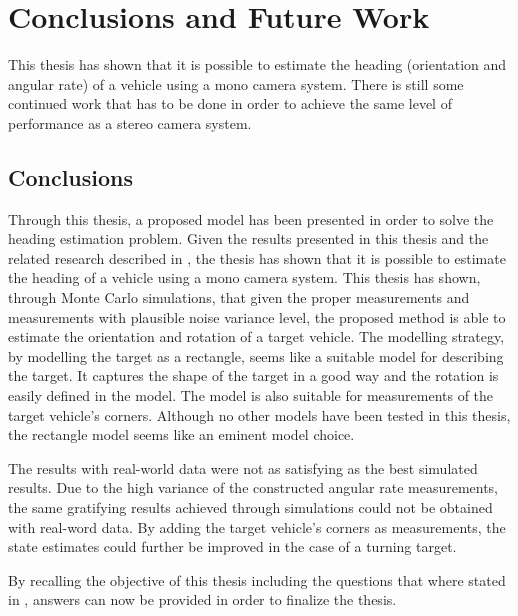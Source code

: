 \chapter{Conclusions and Future Work}
\label{cha:conclusions}

This thesis has shown that it is possible to estimate the heading (orientation and angular rate) of a vehicle using a mono camera system.
There is still some continued work that has to be done in order to achieve the same level of performance as a stereo camera system.

\section{Conclusions}
Through this thesis, a proposed model has been presented in order to solve the heading estimation problem.
Given the results presented in this thesis and the related research described in , the thesis has shown that it is possible to estimate the heading of a vehicle using a mono camera system.
This thesis has shown, through Monte Carlo simulations, that given the proper measurements and measurements with plausible noise variance level, the proposed method is able to estimate the orientation and rotation of a target vehicle.
The modelling strategy, by modelling the target as a rectangle, seems like a suitable model for describing the target.
It captures the shape of the target in a good way and the rotation is easily defined in the model.
The model is also suitable for measurements of the target vehicle's corners.
Although no other models have been tested in this thesis, the rectangle model seems like an eminent model choice.

The results with real-world data were not as satisfying as the best simulated results.
Due to the high variance of the constructed angular rate measurements, the same gratifying results achieved through simulations could not be obtained with real-word data.
By adding the target vehicle's corners as measurements, the state estimates could further be improved in the case of a turning target.

\newpage

By recalling the objective of this thesis including the questions that where stated in , answers can now be provided in order to finalize the thesis.

